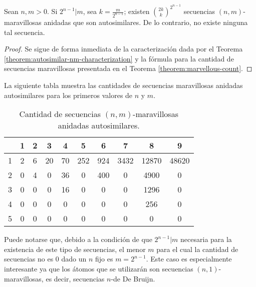 \documentclass[11pt]{article}
\begin{document}
\begin{corollary} \label{corollary:autosimilar-nm-count}
	Sean $n, m > 0$.
	Si $2^{n-1} \vert m$, sea $k = \frac{m}{2^{n-1}}$; existen
	$\binom{2k}{k}^{2^{n-1}}$ secuencias $(n,m)$-maravillosas anidadas que son
	autosimilares.
	De lo contrario, no existe ninguna tal secuencia.
\end{corollary}

\begin{proof}
	Se sigue de forma inmediata de la caracterización dada por el Teorema
	\ref{theorem:autosimilar-nm-characterization} y la fórmula para la cantidad de
	secuencias maravillosas presentada en el Teorema \ref{theorem:marvellous-count}.
\end{proof}

La siguiente tabla muestra las cantidades de secuencias maravillosas anidadas
autosimilares para los primeros valores de $n$ y $m$.

\begin{table}[H]
	\centering
	\begin{tabular}{ c | c | c | c | c | c | c | c | c | c }
		\diagbox{$n$}{$m$}	& 1 & 2 & 3  & 4  & 5   & 6   & 7    & 8     & 9     \\
		\hline
		1 & 2 & 6 & 20 & 70 & 252 & 924 & 3432 & 12870 & 48620
		\\ \hline
		2 & 0 & 4 & 0  & 36 & 0   & 400 & 0    & 4900  & 0     \\
		\hline
		3 & 0 & 0 & 0  & 16 & 0   & 0   & 0    & 1296  & 0     \\
		\hline
		4 & 0 & 0 & 0  & 0  & 0   & 0   & 0    & 256   & 0     \\
		\hline
		5 & 0 & 0 & 0  & 0  & 0   & 0   & 0    & 0     & 0
	\end{tabular}
	\caption{Cantidad de secuencias $(n,m)$-maravillosas anidadas autosimilares.}
\end{table}

Puede notarse que, debido a la condición de que $2^{n-1} \vert m$ necesaria
para la existencia de este tipo de secuencias, el menor $m$ para el cual la
cantidad de secuencias no es $0$ dado un $n$ fijo es $m = 2^{n-1}$. Este caso
es especialmente interesante ya que los átomos que se utilizarán son secuencias
$(n, 1)$-maravillosas, es decir, secuencias $n$-de De Bruijn.


{}

\end{document}
